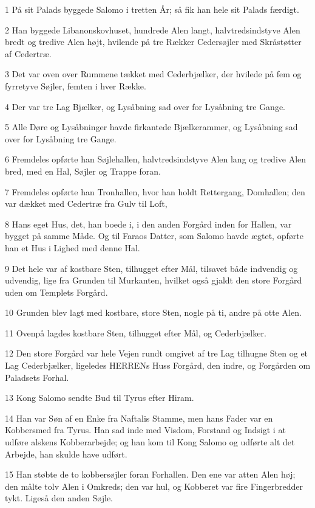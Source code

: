 \par 1 På sit Palads byggede Salomo i tretten År; så fik han hele sit Palads færdigt.
\par 2 Han byggede Libanonskovhuset, hundrede Alen langt, halvtredsindstyve Alen bredt og tredive Alen højt, hvilende på tre Rækker Cedersøjler med Skråstøtter af Cedertræ.
\par 3 Det var oven over Rummene tækket med Cederbjælker, der hvilede på fem og fyrretyve Søjler, femten i hver Række.
\par 4 Der var tre Lag Bjælker, og Lysåbning sad over for Lysåbning tre Gange.
\par 5 Alle Døre og Lysåbninger havde firkantede Bjælkerammer, og Lysåbning sad over for Lysåbning tre Gange.
\par 6 Fremdeles opførte han Søjlehallen, halvtredsindstyve Alen lang og tredive Alen bred, med en Hal, Søjler og Trappe foran.
\par 7 Fremdeles opførte han Tronhallen, hvor han holdt Rettergang, Domhallen; den var dækket med Cedertræ fra Gulv til Loft,
\par 8 Hans eget Hus, det, han boede i, i den anden Forgård inden for Hallen, var bygget på samme Måde. Og til Faraos Datter, som Salomo havde ægtet, opførte han et Hus i Lighed med denne Hal.
\par 9 Det hele var af kostbare Sten, tilhugget efter Mål, tilsavet både indvendig og udvendig, lige fra Grunden til Murkanten, hvilket også gjaldt den store Forgård uden om Templets Forgård.
\par 10 Grunden blev lagt med kostbare, store Sten, nogle på ti, andre på otte Alen.
\par 11 Ovenpå lagdes kostbare Sten, tilhugget efter Mål, og Cederbjælker.
\par 12 Den store Forgård var hele Vejen rundt omgivet af tre Lag tilhugne Sten og et Lag Cederbjælker, ligeledes HERRENs Huss Forgård, den indre, og Forgården om Paladsets Forhal.
\par 13 Kong Salomo sendte Bud til Tyrus efter Hiram.
\par 14 Han var Søn af en Enke fra Naftalis Stamme, men hans Fader var en Kobbersmed fra Tyrus. Han sad inde med Visdom, Forstand og Indsigt i at udføre alskens Kobberarbejde; og han kom til Kong Salomo og udførte alt det Arbejde, han skulde have udført.
\par 15 Han støbte de to kobbersøjler foran Forhallen. Den ene var atten Alen høj; den målte tolv Alen i Omkreds; den var hul, og Kobberet var fire Fingerbredder tykt. Ligeså den anden Søjle.
